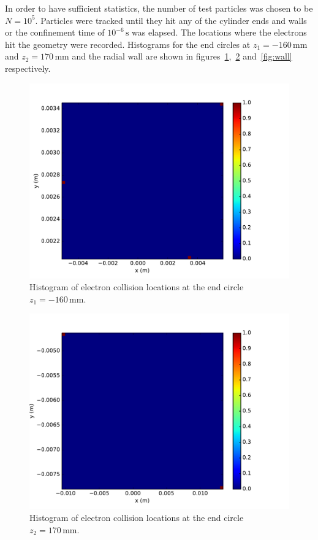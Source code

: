 \documentclass[11pt, a4paper]{article}
\begin{document}
In order to have sufficient statistics, the number of test particles was chosen to be $N=10^5$. Particles were tracked until they hit any of the cylinder ends and walls or the confinement time of $10^{-6}\,\si{\second}$ was elapsed. The locations where the electrons hit the geometry were recorded. Histograms for the end circles at $z_1 = -160\,\si{\milli\meter}$ and $z_2 = 170\,\si{\milli\meter}$ and the radial wall are shown in figures~\ref{fig:z_1_coll},~\ref{fig:z_2_coll} and~\ref{fig:wall} respectively.
\begin{figure}
    \centering
    \includegraphics[width=\textwidth]{output/z1_collision_points.pdf}
    \caption{Histogram of electron collision locations at the end circle $z_1=-160\,\si{\milli\meter}$.}
    \label{fig:z_1_coll}
\end{figure}
\begin{figure}
    \centering
    \includegraphics[width=\textwidth]{output/z2_collision_points.pdf}
    \caption{Histogram of electron collision locations at the end circle $z_2=170\,\si{\milli\meter}$.}
    \label{fig:z_2_coll}
\end{figure}
\end{document}
